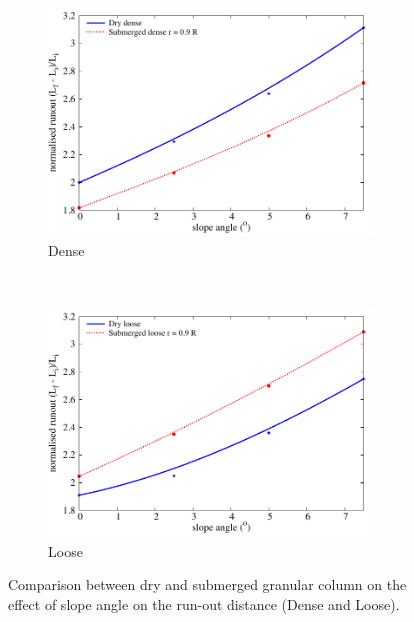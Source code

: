 \begin{figure}
	\centering
\begin{subfigure}[b]{0.95\textwidth}
	\centering
    \includegraphics[width=0.95\textwidth]{slope_runout_dense}
    \caption{Dense}
    \label{fig:slope_runout_dense}
\end{subfigure}\\
\begin{subfigure}[b]{0.95\textwidth}
	\centering
    \includegraphics[width=0.95\textwidth]{slope_runout_loose}
    \caption{Loose}
    \label{fig:slope_runout_loose}
\end{subfigure}
\caption{Comparison between dry and submerged granular column on the effect of 
slope angle on the run-out distance (Dense and Loose).}
\label{fig:slope_loose_dense}
\end{figure}


